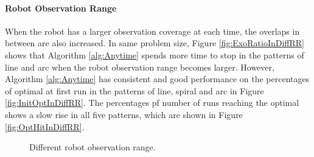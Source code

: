 \paragraph{Robot Observation Range}

When the robot has a larger observation coverage at each time, the overlaps in between are also increased. 
In same problem size, Figure \ref{fig:ExoRatioInDiffRR} shows that Algorithm \ref{alg:Anytime} spends more time to stop in the patterns of line and arc when the robot observation range becomes larger.
However, Algorithm \ref{alg:Anytime} has consistent and good performance on the percentages of optimal at first run in the patterns of line, spiral and arc in Figure \ref{fig:InitOptInDiffRR}. 
The percentages pf number of runs reaching the optimal shows a slow rise in all five patterns, which are shown in Figure \ref{fig:OptHitInDiffRR}.

\begin{figure}[H]
  \centering 
  \caption{Different robot observation range.} 
  \label{fig:PMdiffRR} %
\end{figure}


